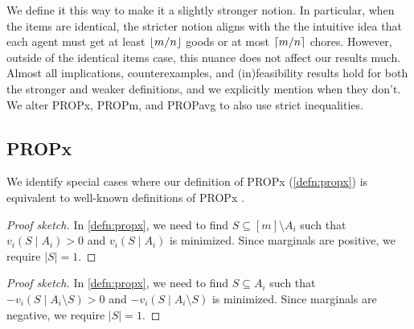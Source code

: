 We define it this way to make it a slightly stronger notion.
In particular, when the items are identical, the stricter notion aligns with the the intuitive idea
that each agent must get at least $\lfloor m/n \rfloor$ goods or at most $\lceil m/n \rceil$ chores.
However, outside of the identical items case, this nuance does not affect our results much.
Almost all implications, counterexamples, and (in)feasibility results
hold for both the stronger and weaker definitions,
and we explicitly mention when they don't.
%
We alter PROPx, PROPm, and PROPavg to also use strict inequalities.

\subsection{PROPx}
\label{sec:notions:propx}

We identify special cases where our definition of PROPx (\cref{defn:propx}) is equivalent to
well-known definitions of PROPx \citep{aziz2020polynomial,li2022almost}.

\begin{proof}[Proof sketch]
In \cref{defn:propx}, we need to find $S \subseteq [m] \setminus A_i$ such that
$v_i(S \mid A_i) > 0$ and $v_i(S \mid A_i)$ is minimized.
Since marginals are positive, we require $|S| = 1$.
\end{proof}

\begin{proof}[Proof sketch]
In \cref{defn:propx}, we need to find $S \subseteq A_i$ such that
$-v_i(S \mid A_i \setminus S) > 0$ and $-v_i(S \mid A_i \setminus S)$ is minimized.
Since marginals are negative, we require $|S| = 1$.
\end{proof}

